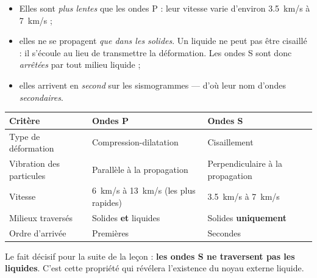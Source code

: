 \documentclass[11pt]{article}
\begin{document}
\begin{propriete}
\begin{itemize}
\item Elles sont \emph{plus lentes} que les ondes P : leur vitesse varie d'environ \SI{3,5}{km/s} à \SI{7}{km/s} ;
\item elles ne se propagent \emph{que dans les solides}. Un liquide ne peut pas être cisaillé : il s'écoule au lieu de transmettre la déformation. Les ondes S sont donc \emph{arrêtées} par tout milieu liquide ;
\item elles arrivent en \emph{second} sur les sismogrammes — d'où leur nom d'ondes \emph{secondaires}.
\end{itemize}
\end{propriete}

\begin{aretenir}
\begin{center}
\begin{tabularx}{\linewidth}{|l|X|X|}
\hline
\rowcolor{popblueL} \textbf{Critère} & \textbf{Ondes P} & \textbf{Ondes S} \\
\hline
Type de déformation & Compression-dilatation & Cisaillement \\
\hline
Vibration des particules & Parallèle à la propagation & Perpendiculaire à la propagation \\
\hline
Vitesse & \SI{6}{km/s} à \SI{13}{km/s} (les plus rapides) & \SI{3,5}{km/s} à \SI{7}{km/s} \\
\hline
Milieux traversés & Solides \textbf{et} liquides & Solides \textbf{uniquement} \\
\hline
Ordre d'arrivée & Premières & Secondes \\
\hline
\end{tabularx}
\end{center}
Le fait décisif pour la suite de la leçon : \textbf{les ondes S ne traversent pas les liquides}. C'est cette propriété qui révélera l'existence du noyau externe liquide.
\end{aretenir}
\end{document}
